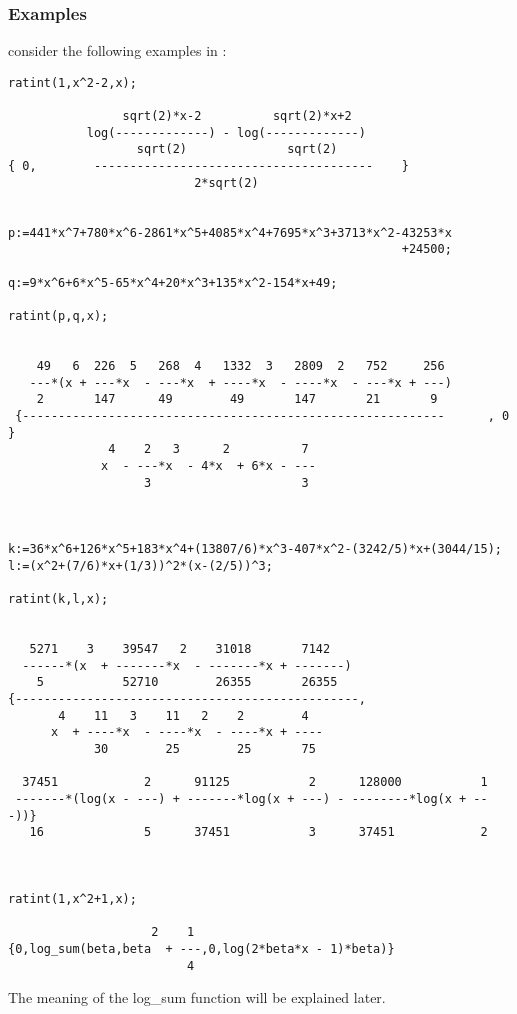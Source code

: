 \subsubsection{Examples}
consider the following examples in \REDUCE:
\begin{verbatim}
ratint(1,x^2-2,x);

                sqrt(2)*x-2          sqrt(2)*x+2
           log(-------------) - log(-------------)
                  sqrt(2)              sqrt(2)
{ 0,        ---------------------------------------    }
                          2*sqrt(2)
   

p:=441*x^7+780*x^6-2861*x^5+4085*x^4+7695*x^3+3713*x^2-43253*x
                                                       +24500;

q:=9*x^6+6*x^5-65*x^4+20*x^3+135*x^2-154*x+49;

ratint(p,q,x);

   
    49   6  226  5   268  4   1332  3   2809  2   752     256
   ---*(x + ---*x  - ---*x  + ----*x  - ----*x  - ---*x + ---)
    2       147      49        49       147       21       9
 {-----------------------------------------------------------      , 0  }
              4    2   3      2          7
             x  - ---*x  - 4*x  + 6*x - ---
                   3                     3

    

k:=36*x^6+126*x^5+183*x^4+(13807/6)*x^3-407*x^2-(3242/5)*x+(3044/15);
l:=(x^2+(7/6)*x+(1/3))^2*(x-(2/5))^3;

ratint(k,l,x);


   5271    3    39547   2    31018       7142
  ------*(x  + -------*x  - -------*x + -------)
    5           52710        26355       26355
{------------------------------------------------,
       4    11   3    11   2    2        4
      x  + ----*x  - ----*x  - ----*x + ----
            30        25        25       75

  37451            2      91125           2      128000           1
 -------*(log(x - ---) + -------*log(x + ---) - --------*log(x + ---))}
   16              5      37451           3      37451            2



ratint(1,x^2+1,x);

                    2    1
{0,log_sum(beta,beta  + ---,0,log(2*beta*x - 1)*beta)}
                         4

\end{verbatim}

The meaning of the log\_sum function will be explained later.

